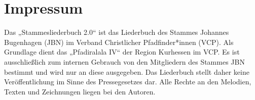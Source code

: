 \section*{Impressum}

\vspace{10pt} Das „Stammesliederbuch 2.0“ ist das Liederbuch des Stammes Johannes Bugenhagen (JBN) im Verband Christlicher Pfadfinder*innen (VCP). Als Grundlage dient das „Pfadiralala IV“ der Region Kurhessen im VCP. Es ist ausschließlich zum internen Gebrauch von den Mitgliedern des Stammes JBN bestimmt und wird nur an diese ausgegeben. Das Liederbuch stellt daher keine Veröffentlichung im Sinne des Pressegesetzes dar. Alle Rechte an den Melodien, Texten und Zeichnungen liegen bei den Autoren. \\ \vspace{10pt}

